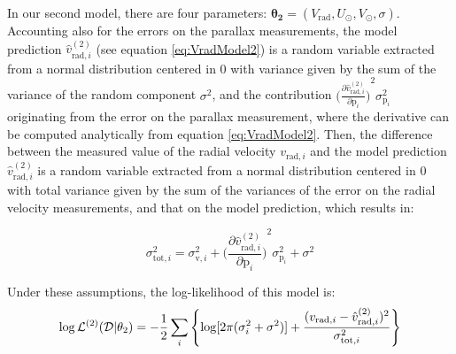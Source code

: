 In our second model, there are four parameters: $\mathbf{\theta_2} = (V_{\text{rad}}, U_{\odot}, V_{\odot}, \sigma)$. 
Accounting also for the errors on the parallax measurements, the model prediction $\hat{v}^{(2)}_{\text{rad}, i}$ (see equation \ref{eq:VradModel2}) is a random variable extracted from a normal distribution centered in 0 with variance given by the sum of the variance of the random component $\sigma^2$, and the contribution $ {\bigl( \frac{\partial \hat{v}^{(2)}_{\text{rad}, i}}{\partial \text{p}_i} \bigr)}^2 \sigma^2_{\text{p}_i}$ originating from the error on the parallax measurement, 
%
%
where the derivative can be computed analytically from equation \ref{eq:VradModel2}.
Then, the difference between the measured value of the radial velocity $v_{\text{rad}, i}$ and the model prediction $\hat{v}^{(2)}_{\text{rad}, i}$ is a random variable extracted from a normal distribution centered in 0 with total variance given by the sum of the variances of the error on the radial velocity measurements, and that on the model prediction, which results in:

\begin{equation}\label{eq:ErrorPropagation}
    \sigma^2_{\text{tot}, i} = \sigma^2_{\text{v},i} +  {\bigl( \frac{\partial \hat{v}^{(2)}_{\text{rad}, i}}{\partial \text{p}_i} \bigr)}^2 \sigma^2_{\text{p}_i} + \sigma^2
\end{equation}

\noindent
Under these assumptions, the log-likelihood of this model is:
\begin{equation}\label{Eq:LogLikeMod2}
    \log \mathbb{\mathcal{L}}^{(2)}(\mathcal{D} \vert \theta_2) = -\frac{1}{2}\sum_i\left\{\log[2\pi(\sigma_{i}^2+\sigma^2)]+\frac{(v_{\text{rad},i} - \hat{v}_{\text{rad},i}^{(2)})^2}{\sigma_{\text{tot}, i}^2}\right\}
\end{equation}


